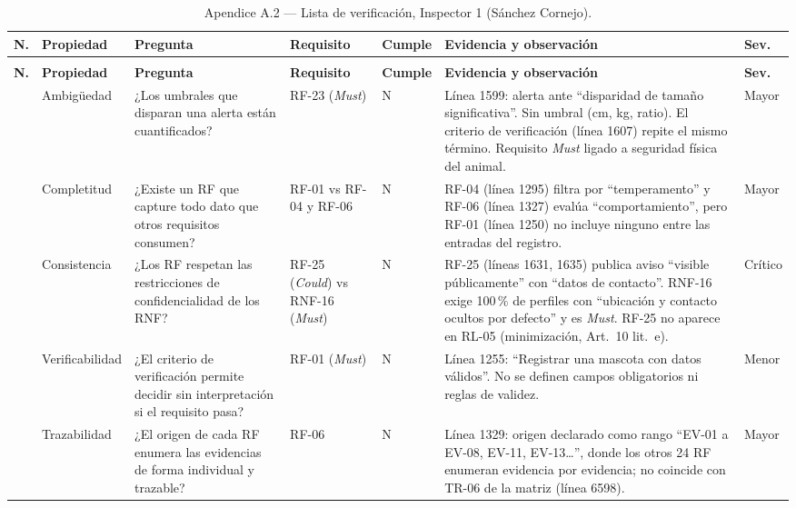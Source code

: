 \documentclass[journal,onecolumn]{IEEEtran}
\begin{document}
	{\scriptsize
		\begin{longtable}{@{}>{\raggedright\arraybackslash}p{0.4cm} >{\raggedright\arraybackslash}p{1.6cm} >{\raggedright\arraybackslash}p{3.0cm} >{\raggedright\arraybackslash}p{2.6cm} >{\raggedright\arraybackslash}p{0.6cm} >{\raggedright\arraybackslash}p{5.4cm} >{\raggedright\arraybackslash}p{1.0cm}@{}}
			\caption{Apendice A.2 --- Lista de verificación, Inspector 1 (Sánchez Cornejo).}\label{tab:anexoA2}\\
			\toprule
			\textbf{N.\textordmasculine{}} & \textbf{Propiedad} & \textbf{Pregunta} & \textbf{Requisito} & \textbf{Cumple} & \textbf{Evidencia y observación} & \textbf{Sev.} \\
			\midrule
			\endfirsthead
			\multicolumn{7}{@{}l}{\small\itshape Anexo A.2 (continuación)}\\
			\toprule
			\textbf{N.\textordmasculine{}} & \textbf{Propiedad} & \textbf{Pregunta} & \textbf{Requisito} & \textbf{Cumple} & \textbf{Evidencia y observación} & \textbf{Sev.} \\
			\midrule
			\endhead
			\bottomrule
			\endfoot
			1 & Ambigüedad & ¿Los umbrales que disparan una alerta están cuantificados? & RF-23 (\emph{Must}) & N & Línea 1599: alerta ante ``disparidad de tamaño significativa''. Sin umbral (cm, kg, ratio). El criterio de verificación (línea 1607) repite el mismo término. Requisito \emph{Must} ligado a seguridad física del animal. & Mayor \\
			2 & Completitud & ¿Existe un RF que capture todo dato que otros requisitos consumen? & RF-01 vs RF-04 y RF-06 & N & RF-04 (línea 1295) filtra por ``temperamento'' y RF-06 (línea 1327) evalúa ``comportamiento'', pero RF-01 (línea 1250) no incluye ninguno entre las entradas del registro. & Mayor \\
			3 & Consistencia & ¿Los RF respetan las restricciones de confidencialidad de los RNF? & RF-25 (\emph{Could}) vs RNF-16 (\emph{Must}) & N & RF-25 (líneas 1631, 1635) publica aviso ``visible públicamente'' con ``datos de contacto''. RNF-16 exige 100\,\% de perfiles con ``ubicación y contacto ocultos por defecto'' y es \emph{Must}. RF-25 no aparece en RL-05 (minimización, Art.\ 10 lit.\ e). & Crítico \\
			4 & Verificabilidad & ¿El criterio de verificación permite decidir sin interpretación si el requisito pasa? & RF-01 (\emph{Must}) & N & Línea 1255: ``Registrar una mascota con datos válidos''. No se definen campos obligatorios ni reglas de validez. & Menor \\
			5 & Trazabilidad & ¿El origen de cada RF enumera las evidencias de forma individual y trazable? & RF-06 & N & Línea 1329: origen declarado como rango ``EV-01 a EV-08, EV-11, EV-13\ldots'', donde los otros 24 RF enumeran evidencia por evidencia; no coincide con TR-06 de la matriz (línea 6598). & Mayor \\

\end{longtable}}
\end{document}
